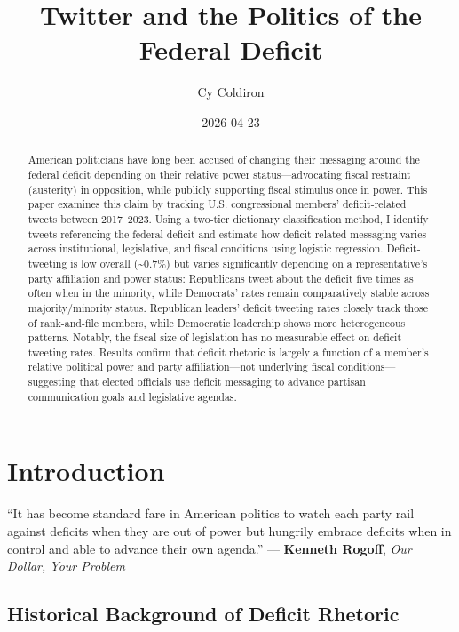 \documentclass[
  12pt,
]{article}
\title{Twitter and the Politics of the Federal Deficit}
\author{Cy Coldiron}
\date{2026-04-23}
\begin{document}
\maketitle
\begin{abstract}
American politicians have long been accused of changing their messaging
around the federal deficit depending on their relative power
status---advocating fiscal restraint (austerity) in opposition, while
publicly supporting fiscal stimulus once in power. This paper examines
this claim by tracking U.S. congressional members' deficit-related
tweets between 2017--2023. Using a two-tier dictionary classification
method, I identify tweets referencing the federal deficit and estimate
how deficit-related messaging varies across institutional, legislative,
and fiscal conditions using logistic regression. Deficit-tweeting is low
overall (\textasciitilde0.7\%) but varies significantly depending on a
representative's party affiliation and power status: Republicans tweet
about the deficit five times as often when in the minority, while
Democrats' rates remain comparatively stable across majority/minority
status. Republican leaders' deficit tweeting rates closely track those
of rank-and-file members, while Democratic leadership shows more
heterogeneous patterns. Notably, the fiscal size of legislation has no
measurable effect on deficit tweeting rates. Results confirm that
deficit rhetoric is largely a function of a member's relative political
power and party affiliation---not underlying fiscal
conditions---suggesting that elected officials use deficit messaging to
advance partisan communication goals and legislative agendas.
\end{abstract}


\section{Introduction}\label{introduction}

``It has become standard fare in American politics to watch each party
rail against deficits when they are out of power but hungrily embrace
deficits when in control and able to advance their own agenda.'' ---
\textbf{Kenneth Rogoff}, \emph{Our Dollar, Your Problem}

\subsection{Historical Background of Deficit
Rhetoric}\label{historical-background-of-deficit-rhetoric}
\end{document}
